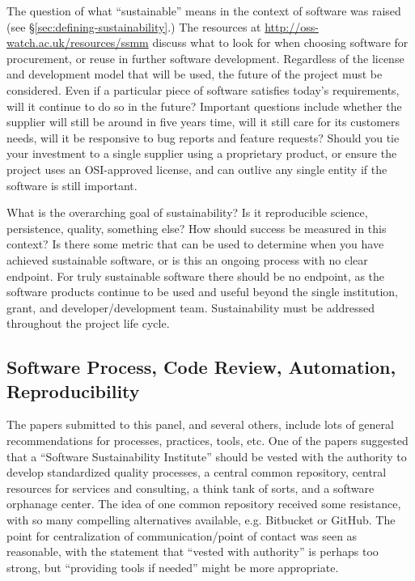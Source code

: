 \documentclass[11pt, oneside]{amsart}
\begin{document}
The question of what ``sustainable'' means in the context of software was
raised (see \S\ref{sec:defining-sustainability}.) The resources at \url{http://oss-watch.ac.uk/resources/ssmm} discuss what
to look for when choosing software for procurement, or reuse in further software
development. Regardless of the license and development model that will be used,
the future of the project must be considered. Even if a particular piece of
software satisfies today's requirements, will it continue to do so in the
future? Important questions include whether the supplier will still be around in five
years time, will it still care for its customers needs, will it be responsive to
bug reports and feature requests? Should you tie your investment to a single
supplier using a proprietary product, or ensure the project uses an OSI-approved
license, and can outlive any single entity if the software is still important.

What is the overarching goal of sustainability? Is it reproducible science,
persistence, quality, something else? How should success be measured in this
context? Is there some metric that can be used to determine when you have
achieved sustainable software, or is this an ongoing process with no clear
endpoint. For truly sustainable software there should be no endpoint, as the
software products continue to be used and useful beyond the single institution,
grant, and developer/development team. Sustainability must be addressed
throughout the project life cycle.

\subsection{Software Process, Code Review, Automation, Reproducibility}

The papers submitted to this panel, and several others, include lots of general
recommendations for processes, practices, tools, etc. One of the papers
suggested that a ``Software Sustainability Institute'' should be vested with
the authority to develop standardized quality processes, a central common
repository, central resources for services and consulting, a think tank of
sorts, and a software orphanage center. The idea of one common repository received
some resistance, with so many compelling alternatives available, e.g. Bitbucket or
GitHub. The point for centralization of communication/point of contact was seen as
reasonable, with the statement that ``vested with authority'' is perhaps too strong,
but ``providing tools if needed'' might be more appropriate.
\end{document}
